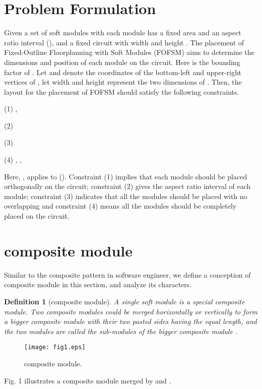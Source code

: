 \documentclass[conference]{IEEEtran}
\begin{document}
\section{Problem Formulation}

Given a set of  soft modules with each module  has a fixed area  and an aspect ratio interval  (), and a fixed circuit with width  and height . The placement of Fixed-Outline Floorplanning with Soft Modules (FOFSM) aims to determine the dimensions and position of each module on the circuit. Here  is the bounding factor of . Let  and  denote the coordinates of the bottom-left and upper-right vertices of , let width  and height  represent the two dimensions of . Then, the layout for the placement of FOFSM should satisfy the following constraints.

(1) , 

(2) 

(3) 

(4) , , 

Here, ,  applies to  (). Constraint (1) implies that each module should be placed orthogonally on the circuit; constraint (2) gives the aspect ratio interval of each module; constraint (3) indicates that all the modules should be placed with no overlapping and constraint (4) means all the modules should be completely placed on the circuit.

\section{composite module}

Similar to the composite pattern in software engineer, we define a conception of composite module in this section, and analyze its characters.
\newtheorem{definition}{Definition}
\begin{definition}[composite module]
A single soft module is a special composite module. Two composite modules could be merged horizontally or vertically to form a bigger composite module with their two pasted sides having the equal length, and the two modules are called the sub-modules of the bigger composite module .
\end{definition}

\begin{figure}[!t]
\centering
\texttt{[image: fig1.eps]}
\caption{composite module.}
\label{fig_sim}
\end{figure}

Fig. 1 illustrates a composite module merged by  and .
\end{document}
